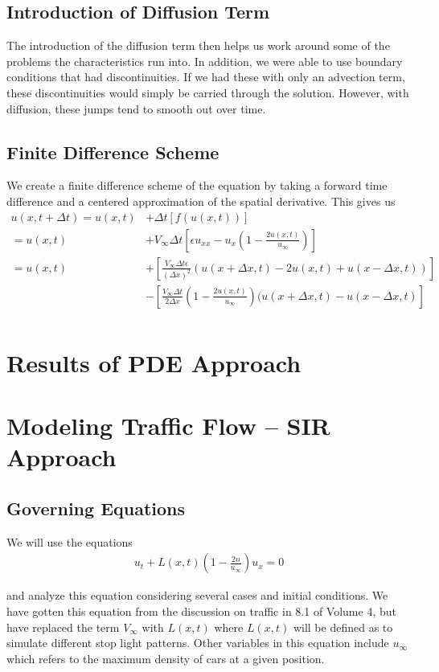 \documentclass[12pt]{article}
\begin{document}
\subsection{Introduction of Diffusion Term}
The introduction of the diffusion term then helps us work around some of the problems the characteristics run into. In addition, we were able to use boundary conditions that had discontinuities. If we had these with only an advection term, these discontinuities would simply be carried through the solution. However, with diffusion, these jumps tend to smooth out over time.

\subsection{Finite Difference Scheme}
We create a finite difference scheme of the equation by taking a forward time difference and a centered approximation of the spatial derivative. This gives us
\begin{align*}
u(x,t+\Delta t)=u(x,t)&+\Delta t[f(u(x,t))] \\
=u(x,t)&+V_{\infty}\Delta t\left[\epsilon u_{xx}-u_x\left(1-\frac{2u(x,t)}{u_{\infty}}\right)\right] \\
=u(x,t)&+\left[\frac{V_{\infty}\Delta t\epsilon}{(\Delta x)^2}(u(x+\Delta x, t)-2u(x,t)+u(x-\Delta x,t))\right] \\
&-\left[\frac{V_{\infty}\Delta t}{2\Delta x}\left(1-\frac{2u(x,t)}{u_{\infty}}\right)(u(x+\Delta x,t)-u(x-\Delta x,t)\right] \\
\end{align*}
\section{Results of PDE Approach}

\section{Modeling Traffic Flow – SIR Approach}

\subsection{Governing Equations} 
We will use the equations 
\begin{align*}
    u_t + L(x, t) ( 1 - \frac{2n}{u_\infty} ) u_x = 0 
\end{align*}

and analyze this equation considering several cases and initial conditions. We have gotten this equation from the discussion on traffic in 8.1 of Volume 4, but have replaced the term $V_\infty$ with $L(x, t)$ where $L(x, t)$ will be defined as to simulate different stop light patterns. Other variables in this equation include $u_\infty$ which refers to the maximum density of cars at a given position. 
\end{document}
